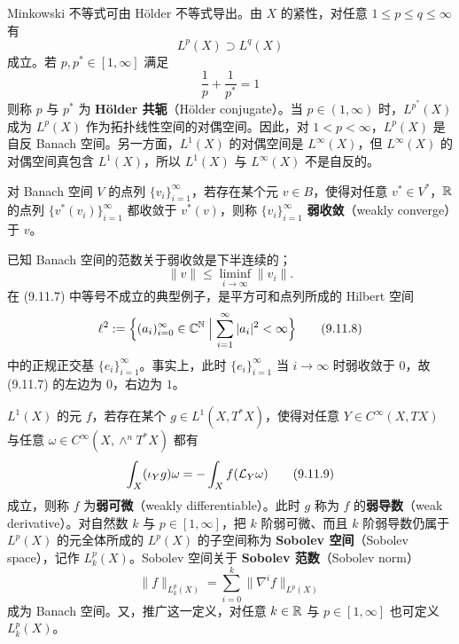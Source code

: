 Minkowski 不等式可由 Hölder 不等式导出。由 $X$ 的紧性，对任意 $1\le p\le q\le\infty$ 有
\begin{equation}
  L^p(X) \supset L^q(X)
  \tag{9.11.5}
\end{equation}
成立。若 $p,p^*\in[1,\infty]$ 满足
\begin{equation}
  \frac1p + \frac1{p^*} = 1
  \tag{9.11.6}
\end{equation}
则称 $p$ 与 $p^*$ 为 \textbf{Hölder 共轭}（Hölder conjugate）。当 $p\in(1,\infty)$ 时，$L^{p^*}(X)$ 成为 $L^p(X)$ 作为拓扑线性空间的对偶空间。因此，对 $1<p<\infty$，$L^p(X)$ 是自反 Banach 空间。另一方面，$L^1(X)$ 的对偶空间是 $L^\infty(X)$，但 $L^\infty(X)$ 的对偶空间真包含 $L^1(X)$，所以 $L^1(X)$ 与 $L^\infty(X)$ 不是自反的。

对 Banach 空间 $V$ 的点列 $\{v_i\}_{i=1}^\infty$，若存在某个元 $v\in B$，使得对任意 $v^*\in V^*$，$\mathbb{R}$ 的点列 $\{v^*(v_i)\}_{i=1}^\infty$ 都收敛于 $v^*(v)$，则称 $\{v_i\}_{i=1}^\infty$ \textbf{弱收敛}（weakly converge）于 $v$。


已知 Banach 空间的范数关于弱收敛是下半连续的；
\begin{equation}
  \|v\| \le \liminf_{i\to\infty}\|v_i\|.
  \tag{9.11.7}
\end{equation}
在 (9.11.7) 中等号不成立的典型例子，是平方可和点列所成的 Hilbert 空间
\begin{equation}
  \ell^2 := \Bigl\{(a_i)_{i=0}^\infty\in\mathbb{C}^{\mathbb{N}}
  \Bigm| \sum_{i=1}^\infty |a_i|^2 < \infty\Bigr\}
  \tag{9.11.8}
\end{equation}
中的正规正交基 $\{e_i\}_{i=1}^\infty$。事实上，此时 $\{e_i\}_{i=1}^\infty$ 当 $i\to\infty$ 时弱收敛于 $0$，故 (9.11.7) 的左边为 $0$，右边为 $1$。

$L^1(X)$ 的元 $f$，若存在某个 $g\in L^1(X,T^*X)$，使得对任意 $Y\in C^\infty(X,TX)$ 与任意 $\omega\in C^\infty(X,\wedge^nT^*X)$ 都有
\begin{equation}
  \int_X (\iota_Y g)\omega = -\int_X f(\mathcal{L}_Y\omega)
  \tag{9.11.9}
\end{equation}
成立，则称 $f$ 为\textbf{弱可微}（weakly differentiable）。此时 $g$ 称为 $f$ 的\textbf{弱导数}（weak derivative）。对自然数 $k$ 与 $p\in[1,\infty]$，把 $k$ 阶弱可微、而且 $k$ 阶弱导数仍属于 $L^p(X)$ 的元全体所成的 $L^p(X)$ 的子空间称为 \textbf{Sobolev 空间}（Sobolev space），记作 $L^p_k(X)$。Sobolev 空间关于 \textbf{Sobolev 范数}（Sobolev norm）
\begin{equation}
  \|f\|_{L^p_k(X)} = \sum_{i=0}^k \|\nabla^i f\|_{L^p(X)}
  \tag{9.11.10}
\end{equation}
成为 Banach 空间。又，推广这一定义，对任意 $k\in\mathbb{R}$ 与 $p\in[1,\infty]$ 也可定义 $L^p_k(X)$。


